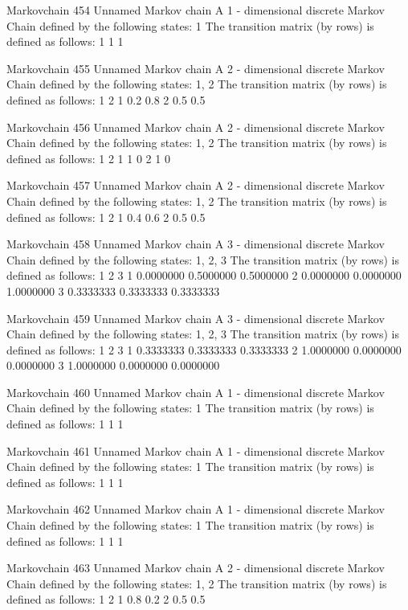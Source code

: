 \documentclass[
  nojss]{jss}
\begin{document}
\begin{CodeChunk}
\begin{CodeOutput}
Markovchain  454 
Unnamed Markov chain 
 A  1 - dimensional discrete Markov Chain defined by the following states: 
 1 
 The transition matrix  (by rows)  is defined as follows: 
  1
1 1

Markovchain  455 
Unnamed Markov chain 
 A  2 - dimensional discrete Markov Chain defined by the following states: 
 1, 2 
 The transition matrix  (by rows)  is defined as follows: 
    1   2
1 0.2 0.8
2 0.5 0.5

Markovchain  456 
Unnamed Markov chain 
 A  2 - dimensional discrete Markov Chain defined by the following states: 
 1, 2 
 The transition matrix  (by rows)  is defined as follows: 
  1 2
1 1 0
2 1 0

Markovchain  457 
Unnamed Markov chain 
 A  2 - dimensional discrete Markov Chain defined by the following states: 
 1, 2 
 The transition matrix  (by rows)  is defined as follows: 
    1   2
1 0.4 0.6
2 0.5 0.5

Markovchain  458 
Unnamed Markov chain 
 A  3 - dimensional discrete Markov Chain defined by the following states: 
 1, 2, 3 
 The transition matrix  (by rows)  is defined as follows: 
          1         2         3
1 0.0000000 0.5000000 0.5000000
2 0.0000000 0.0000000 1.0000000
3 0.3333333 0.3333333 0.3333333

Markovchain  459 
Unnamed Markov chain 
 A  3 - dimensional discrete Markov Chain defined by the following states: 
 1, 2, 3 
 The transition matrix  (by rows)  is defined as follows: 
          1         2         3
1 0.3333333 0.3333333 0.3333333
2 1.0000000 0.0000000 0.0000000
3 1.0000000 0.0000000 0.0000000

Markovchain  460 
Unnamed Markov chain 
 A  1 - dimensional discrete Markov Chain defined by the following states: 
 1 
 The transition matrix  (by rows)  is defined as follows: 
  1
1 1

Markovchain  461 
Unnamed Markov chain 
 A  1 - dimensional discrete Markov Chain defined by the following states: 
 1 
 The transition matrix  (by rows)  is defined as follows: 
  1
1 1

Markovchain  462 
Unnamed Markov chain 
 A  1 - dimensional discrete Markov Chain defined by the following states: 
 1 
 The transition matrix  (by rows)  is defined as follows: 
  1
1 1

Markovchain  463 
Unnamed Markov chain 
 A  2 - dimensional discrete Markov Chain defined by the following states: 
 1, 2 
 The transition matrix  (by rows)  is defined as follows: 
    1   2
1 0.8 0.2
2 0.5 0.5


\end{CodeOutput}
\end{CodeChunk}
\end{document}
